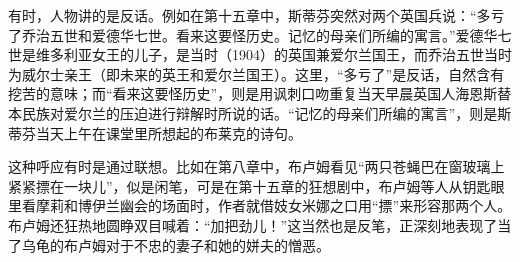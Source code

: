 \par 有时，人物讲的是反话。例如在第十五章中，斯蒂芬突然对两个英国兵说：“多亏了乔治五世和爱德华七世。看来这要怪历史。记忆的母亲们所编的寓言。”爱德华七世是维多利亚女王的儿子，是当时（1904）的英国兼爱尔兰国王，而乔治五世当时为威尔士亲王（即未来的英王和爱尔兰国王）。这里，“多亏了”是反话，自然含有挖苦的意味；而“看来这要怪历史”，则是用讽刺口吻重复当天早晨英国人海恩斯替本民族对爱尔兰的压迫进行辩解时所说的话。“记忆的母亲们所编的寓言”，则是斯蒂芬当天上午在课堂里所想起的布莱克的诗句。
\par 这种呼应有时是通过联想。比如在第八章中，布卢姆看见“两只苍蝇巴在窗玻璃上紧紧摽在一块儿”，似是闲笔，可是在第十五章的狂想剧中，布卢姆等人从钥匙眼里看摩莉和博伊兰幽会的场面时，作者就借妓女米娜之口用“摽”来形容那两个人。布卢姆还狂热地圆睁双目喊着：“加把劲儿！”这当然也是反笔，正深刻地表现了当了乌龟的布卢姆对于不忠的妻子和她的姘夫的憎恶。



